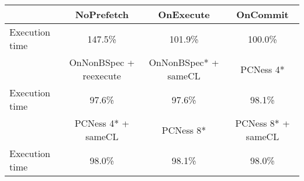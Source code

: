 \begin{tabular}{ l|ccc }
 & NoPrefetch & OnExecute & OnCommit\\ \hline
Execution time & 147.5\% & 101.9\% & 100.0\%\\ \hline
\hline
 & OnNonBSpec + reexecute & OnNonBSpec* + sameCL & PCNess 4*\\ \hline
Execution time & 97.6\% & 97.6\% & 98.1\%\\ \hline
\hline
 & PCNess 4* + sameCL & PCNess 8* & PCNess 8* + sameCL\\ \hline
Execution time & 98.0\% & 98.1\% & 98.0\%\\ \hline
\end{tabular}

